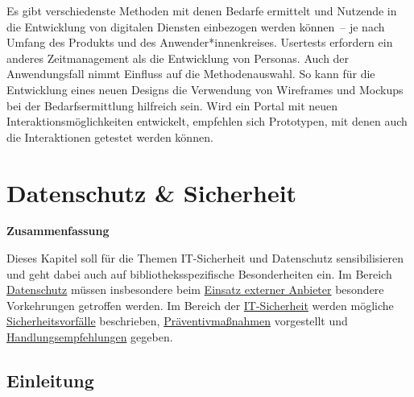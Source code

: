 \documentclass[
  11pt,
  letterpaper,
  DIV=11,
  twoside]{scrreprt}
\begin{document}
Es gibt verschiedenste Methoden mit denen Bedarfe ermittelt und Nutzende
in die Entwicklung von digitalen Diensten einbezogen werden können~-- je
nach Umfang des Produkts und des Anwender*innenkreises. Usertests
erfordern ein anderes Zeitmanagement als die Entwicklung von Personas.
Auch der Anwendungsfall nimmt Einfluss auf die Methodenauswahl. So kann
für die Entwicklung eines neuen Designs die Verwendung von Wireframes
und Mockups bei der Bedarfsermittlung hilfreich sein. Wird ein Portal
mit neuen Interaktionsmöglichkeiten entwickelt, empfehlen sich
Prototypen, mit denen auch die Interaktionen getestet werden können.


\chapter{Datenschutz \& Sicherheit}\label{sec-sicherheit}

\begin{tcolorbox}[enhanced jigsaw, leftrule=.75mm, toprule=.15mm, left=2mm, opacityback=0, arc=.35mm, colback=white, breakable, colframe=quarto-callout-note-color-frame, rightrule=.15mm, bottomrule=.15mm]
\begin{minipage}[t]{5.5mm}
\textcolor{quarto-callout-note-color}{\faInfo}
\end{minipage}%
\begin{minipage}[t]{\textwidth - 5.5mm}

\vspace{-3mm}\textbf{Zusammenfassung}\vspace{3mm}

Dieses Kapitel soll für die Themen IT-Sicherheit und Datenschutz
sensibilisieren und geht dabei auch auf bibliotheksspezifische
Besonderheiten ein. Im Bereich \hyperref[datenschutz]{Datenschutz}
müssen insbesondere beim \hyperref[sec-datenschutz-externe]{Einsatz
externer Anbieter} besondere Vorkehrungen getroffen werden. Im Bereich
der \hyperref[it-sicherheit]{IT-Sicherheit} werden mögliche
\hyperref[sec-sicherheitsvorfall]{Sicherheitsvorfälle} beschrieben,
\hyperref[pruxe4ventivmauxdfnahmen]{Präventivmaßnahmen} vorgestellt und
\hyperref[handlungsempfehlungen]{Handlungsempfehlungen} gegeben.

\end{minipage}%
\end{tcolorbox}

\section{Einleitung}\label{einleitung-4}
\end{document}
